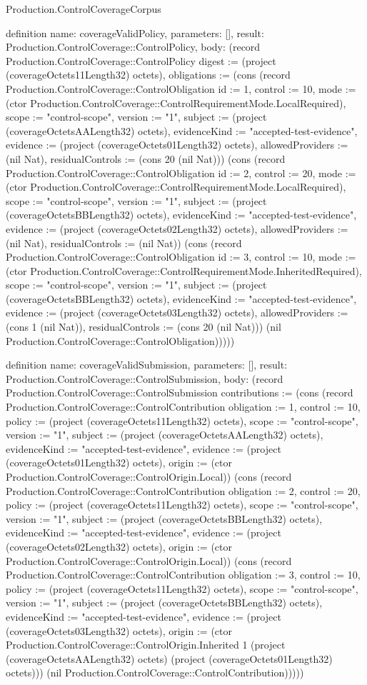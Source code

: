 \begin{lexlean}{Production.ControlCoverageCorpus}
\begin{semanticmodule}
definition{
  name: coverageValidPolicy,
  parameters: [],
  result: Production.ControlCoverage::ControlPolicy,
  body: (record Production.ControlCoverage::ControlPolicy {digest := (project (coverageOctets11Length32) octets), obligations := (cons (record Production.ControlCoverage::ControlObligation {id := 1, control := 10, mode := (ctor Production.ControlCoverage::ControlRequirementMode.LocalRequired), scope := "control-scope", version := "1", subject := (project (coverageOctetsAALength32) octets), evidenceKind := "accepted-test-evidence", evidence := (project (coverageOctets01Length32) octets), allowedProviders := (nil Nat), residualControls := (cons 20 (nil Nat))}) (cons (record Production.ControlCoverage::ControlObligation {id := 2, control := 20, mode := (ctor Production.ControlCoverage::ControlRequirementMode.LocalRequired), scope := "control-scope", version := "1", subject := (project (coverageOctetsBBLength32) octets), evidenceKind := "accepted-test-evidence", evidence := (project (coverageOctets02Length32) octets), allowedProviders := (nil Nat), residualControls := (nil Nat)}) (cons (record Production.ControlCoverage::ControlObligation {id := 3, control := 10, mode := (ctor Production.ControlCoverage::ControlRequirementMode.InheritedRequired), scope := "control-scope", version := "1", subject := (project (coverageOctetsBBLength32) octets), evidenceKind := "accepted-test-evidence", evidence := (project (coverageOctets03Length32) octets), allowedProviders := (cons 1 (nil Nat)), residualControls := (cons 20 (nil Nat))}) (nil Production.ControlCoverage::ControlObligation))))})
}

definition{
  name: coverageValidSubmission,
  parameters: [],
  result: Production.ControlCoverage::ControlSubmission,
  body: (record Production.ControlCoverage::ControlSubmission {contributions := (cons (record Production.ControlCoverage::ControlContribution {obligation := 1, control := 10, policy := (project (coverageOctets11Length32) octets), scope := "control-scope", version := "1", subject := (project (coverageOctetsAALength32) octets), evidenceKind := "accepted-test-evidence", evidence := (project (coverageOctets01Length32) octets), origin := (ctor Production.ControlCoverage::ControlOrigin.Local)}) (cons (record Production.ControlCoverage::ControlContribution {obligation := 2, control := 20, policy := (project (coverageOctets11Length32) octets), scope := "control-scope", version := "1", subject := (project (coverageOctetsBBLength32) octets), evidenceKind := "accepted-test-evidence", evidence := (project (coverageOctets02Length32) octets), origin := (ctor Production.ControlCoverage::ControlOrigin.Local)}) (cons (record Production.ControlCoverage::ControlContribution {obligation := 3, control := 10, policy := (project (coverageOctets11Length32) octets), scope := "control-scope", version := "1", subject := (project (coverageOctetsBBLength32) octets), evidenceKind := "accepted-test-evidence", evidence := (project (coverageOctets03Length32) octets), origin := (ctor Production.ControlCoverage::ControlOrigin.Inherited 1 (project (coverageOctetsAALength32) octets) (project (coverageOctets01Length32) octets))}) (nil Production.ControlCoverage::ControlContribution))))})
}


\end{semanticmodule}
\end{lexlean}
